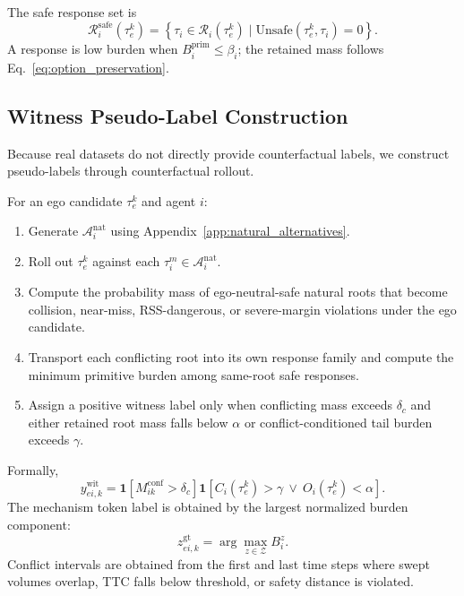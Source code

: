 \documentclass[10pt]{article}
\begin{document}
The safe response set is
\begin{equation}
    \mathcal{R}^{\mathrm{safe}}_i(\tau^k_e)
    =
    \left\{
    \tau_i\in\mathcal{R}_i(\tau^k_e)
    \mid
    \mathrm{Unsafe}(\tau^k_e,\tau_i)=0
    \right\}.
\end{equation}
A response is low burden when $B_i^{\mathrm{prim}}\le\beta_i$; the retained mass follows Eq.~\eqref{eq:option_preservation}.

\subsection{Witness Pseudo-Label Construction}
\label{app:witness_supervision}

Because real datasets do not directly provide counterfactual labels, we construct pseudo-labels through counterfactual rollout.

For an ego candidate $\tau^k_e$ and agent $i$:
\begin{enumerate}
    \item Generate $\mathcal{A}^{\mathrm{nat}}_i$ using Appendix~\ref{app:natural_alternatives}.
    \item Roll out $\tau^k_e$ against each $\tau_i^{m}\in\mathcal{A}^{\mathrm{nat}}_i$.
    \item Compute the probability mass of ego-neutral-safe natural roots that become collision, near-miss, RSS-dangerous, or severe-margin violations under the ego candidate.
    \item Transport each conflicting root into its own response family and compute the minimum primitive burden among same-root safe responses.
    \item Assign a positive witness label only when conflicting mass exceeds $\delta_c$ and either retained root mass falls below $\alpha$ or conflict-conditioned tail burden exceeds $\gamma$.
\end{enumerate}

Formally,
\begin{equation}
    y^{\mathrm{wit}}_{ei,k}
    =
    \mathbf{1}\!\left[M^{\mathrm{conf}}_{ik}>\delta_c\right]
    \mathbf{1}\!\left[C_i(\tau^k_e)>\gamma\ \vee\ O_i(\tau^k_e)<\alpha\right].
\end{equation}
The mechanism token label is obtained by the largest normalized burden component:
\begin{equation}
    z^{\mathrm{gt}}_{ei,k}
    =
    \arg\max_{z\in\mathcal{Z}}
    B^z_i .
\end{equation}
Conflict intervals are obtained from the first and last time steps where swept volumes overlap, TTC falls below threshold, or safety distance is violated.
\end{document}
